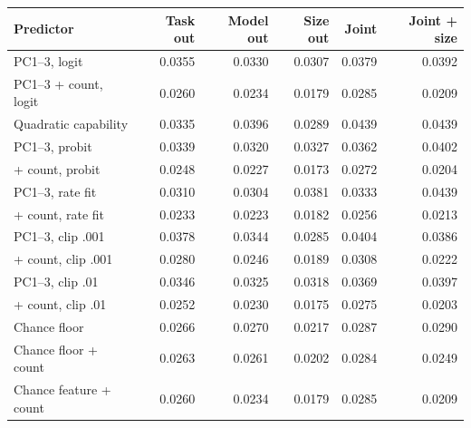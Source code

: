 \begin{tabular}{lrrrrr}
\toprule
Predictor & Task out & Model out & Size out & Joint & Joint + size\\
\midrule
PC1--3, logit & 0.0355 & 0.0330 & 0.0307 & 0.0379 & 0.0392\\
PC1--3 + count, logit & 0.0260 & 0.0234 & 0.0179 & 0.0285 & 0.0209\\
Quadratic capability & 0.0335 & 0.0396 & 0.0289 & 0.0439 & 0.0439\\
PC1--3, probit & 0.0339 & 0.0320 & 0.0327 & 0.0362 & 0.0402\\
+ count, probit & 0.0248 & 0.0227 & 0.0173 & 0.0272 & 0.0204\\
PC1--3, rate fit & 0.0310 & 0.0304 & 0.0381 & 0.0333 & 0.0439\\
+ count, rate fit & 0.0233 & 0.0223 & 0.0182 & 0.0256 & 0.0213\\
PC1--3, clip .001 & 0.0378 & 0.0344 & 0.0285 & 0.0404 & 0.0386\\
+ count, clip .001 & 0.0280 & 0.0246 & 0.0189 & 0.0308 & 0.0222\\
PC1--3, clip .01 & 0.0346 & 0.0325 & 0.0318 & 0.0369 & 0.0397\\
+ count, clip .01 & 0.0252 & 0.0230 & 0.0175 & 0.0275 & 0.0203\\
Chance floor & 0.0266 & 0.0270 & 0.0217 & 0.0287 & 0.0290\\
Chance floor + count & 0.0263 & 0.0261 & 0.0202 & 0.0284 & 0.0249\\
Chance feature + count & 0.0260 & 0.0234 & 0.0179 & 0.0285 & 0.0209\\
\bottomrule
\end{tabular}
